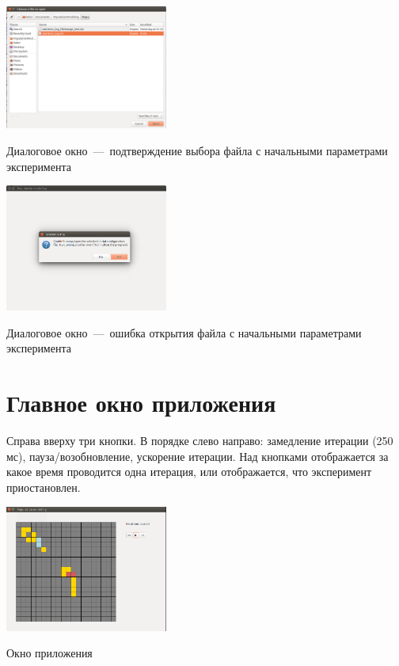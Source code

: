\documentclass[11pt,twoside,twocolumn,russian,a4paper]{article}
\begin{document}
\begin{center}
\captionsetup{type=figure}
  \includegraphics[width=0.4\textwidth]{help-scr5.png}
	\caption{Диалоговое окно~---~подтверждение выбора файла с начальными параметрами эксперимента}
\end{center}

\begin{center}
\captionsetup{type=figure}
  \includegraphics[width=0.4\textwidth]{help-scr6.png}
	\caption{Диалоговое окно~---~ошибка открытия файла с начальными параметрами эксперимента}
\end{center}

\section{\color{blue} Главное окно приложения}

\noindent Справа вверху три кнопки. В порядке слево направо: замедление итерации (250 мс), пауза/возобновление, ускорение итерации. Над кнопками отображается за какое время проводится одна итерация, или отображается, что эксперимент приостановлен.

\begin{center}
\captionsetup{type=figure}
  \includegraphics[width=0.4\textwidth]{help-scr8.png}
	\caption{Окно приложения}
\end{center}
\end{document}
